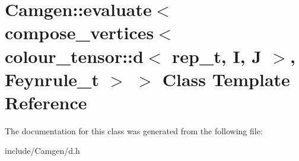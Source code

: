 \hypertarget{a00166}{}\section{Camgen\+:\+:evaluate$<$ compose\+\_\+vertices$<$ colour\+\_\+tensor\+:\+:d$<$ rep\+\_\+t, I, J $>$, Feynrule\+\_\+t $>$ $>$ Class Template Reference}
\label{a00166}


The documentation for this class was generated from the following file\+:\begin{DoxyCompactItemize}
\item 
include/\+Camgen/d.\+h\end{DoxyCompactItemize}

